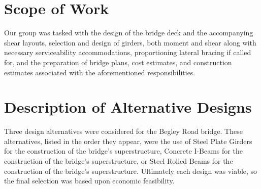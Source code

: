 \section{Scope of Work}\label{sec:1.3}
Our group was tasked with the design of the bridge deck and the accompanying shear layouts, selection and design of girders, both moment and shear along with necessary serviceability accommodations, proportioning lateral bracing if called for, and the preparation of bridge plans, cost estimates, and construction estimates associated with the aforementioned responsibilities.

\section{Description of Alternative Designs}\label{sec:1.4}
Three design alternatives were considered for the Begley Road bridge.  These alternatives, listed in the order they appear, were the use of Steel Plate Girders for the construction of the bridge's superstructure, Concrete I-Beams for the construction of the bridge's superstructure, or Steel Rolled Beams for the construction of the bridge's superstructure.  Ultimately each design was viable, so the final selection was based upon economic feasibility.
